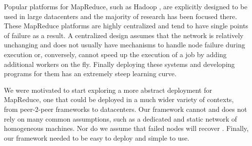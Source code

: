 \documentclass[10pt, conference, compsocconf]{IEEEtran}
\begin{document}

Popular platforms for MapReduce, such as Hadoop \cite{Hadoop}, are explicitly designed to be used in large datacenters \cite{hadoopAssumptions} and the majority of research has been focused there.  
These MapReduce platforms are highly centralized and tend to have single points of failure\cite{shvachko2010hadoop} as a result.   A centralized design assumes that the network is relatively unchanging and does not usually have mechanisms to handle node failure during execution or, conversely, cannot speed up the execution of a job by adding additional workers on the fly.  Finally deploying these systems and developing programs for them has an extremely steep learning curve.


We were motivated to start exploring a more abstract deployment for MapReduce, one that could be deployed in a much wider variety of contexts, from peer-2-peer frameworks to datacenters.  Our framework cannot and does not rely on many common assumptions, such as a dedicated and static network of homogeneous machines. Nor do we assume that failed nodes will recover \cite{hadoopAssumptions}.  Finally, our framework needed to be easy to deploy and simple to use.    
\end{document}
